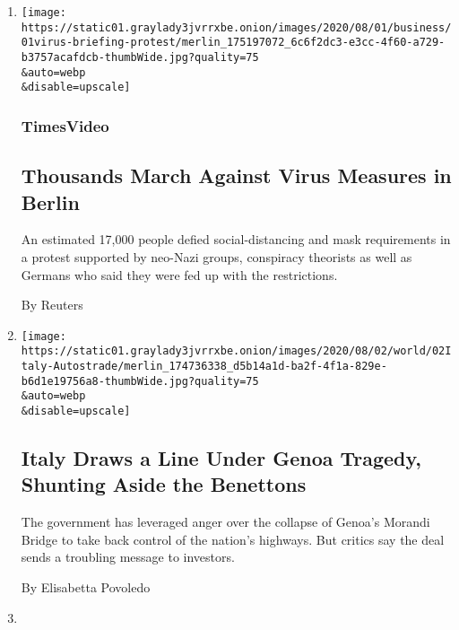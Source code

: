 \begin{enumerate}
\def\labelenumi{\arabic{enumi}.}
\item
  \href{/video/world/europe/100000007268465/coronavirus-protest-germany.html}{}

  \texttt{[image: https://static01.graylady3jvrrxbe.onion/images/2020/08/01/business/01virus-briefing-protest/merlin\_175197072\_6c6f2dc3-e3cc-4f60-a729-b3757acafdcb-thumbWide.jpg?quality=75\\\&auto=webp\\\&disable=upscale]}

  \hypertarget{timesvideo}{%
  \subsubsection{TimesVideo}\label{timesvideo}}

  \hypertarget{thousands-march-against-virus-measures-in-berlin}{%
  \subsection{Thousands March Against Virus Measures in
  Berlin}\label{thousands-march-against-virus-measures-in-berlin}}

  An estimated 17,000 people defied social-distancing and mask
  requirements in a protest supported by neo-Nazi groups, conspiracy
  theorists as well as Germans who said they were fed up with the
  restrictions.

  By Reuters
\item
  \href{/2020/08/01/world/europe/italy-genoa-bridge-collapse-benettons.html}{}

  \texttt{[image: https://static01.graylady3jvrrxbe.onion/images/2020/08/02/world/02Italy-Autostrade/merlin\_174736338\_d5b14a1d-ba2f-4f1a-829e-b6d1e19756a8-thumbWide.jpg?quality=75\\\&auto=webp\\\&disable=upscale]}

  \hypertarget{italy-draws-a-line-under-genoa-tragedy-shunting-aside-the-benettons}{%
  \subsection{Italy Draws a Line Under Genoa Tragedy, Shunting Aside the
  Benettons}\label{italy-draws-a-line-under-genoa-tragedy-shunting-aside-the-benettons}}

  The government has leveraged anger over the collapse of Genoa's
  Morandi Bridge to take back control of the nation's highways. But
  critics say the deal sends a troubling message to investors.

  By Elisabetta Povoledo
\item
  \href{/2020/08/01/world/europe/germany-nazi-infiltration.html}{}


\end{enumerate}
